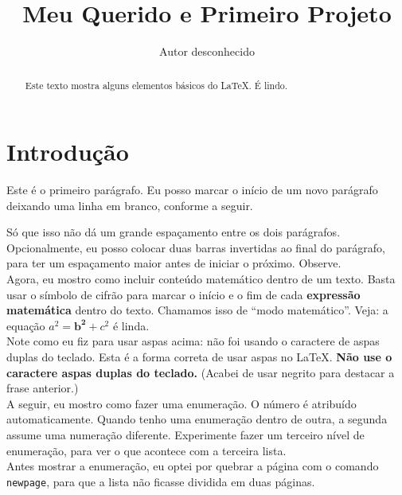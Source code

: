 \documentclass{article}
\title{Meu Querido e Primeiro Projeto}
\author{Autor desconhecido}
\begin{document}
\maketitle

\begin{abstract}
    Este texto mostra alguns elementos básicos do \LaTeX. É lindo.
\end{abstract}

\section{Introdução}

\indent Este é o primeiro parágrafo. Eu posso marcar o início de um novo parágrafo deixando uma linha em branco, conforme a seguir.

Só que isso não dá um grande espaçamento entre os dois parágrafos. Opcio\-nalmen\-te, eu posso colocar duas barras invertidas ao final do parágrafo, para ter um espaçamento maior antes de iniciar o próximo. Observe.\\

Agora, eu mostro como incluir conteúdo matemático dentro de um texto. Basta usar o símbolo de cifrão para marcar o início e o fim de cada \textbf{expressão matemática} dentro do texto. Chamamos isso de ``modo matemático''. Veja: a equação $a^2 = \mathbf{b^2} + c^2$ é linda.\\

Note como eu fiz para usar aspas acima: não foi usando o caractere de aspas duplas do teclado. Esta é a forma correta de usar aspas no \LaTeX. \textbf{Não use o caractere aspas duplas do teclado.} (Acabei de usar negrito para destacar a frase anterior.)\\

A seguir, eu mostro como fazer uma enumeração. O número é atribuído automaticamente. Quando tenho uma enumeração dentro de outra, a segunda assume uma numeração diferente. Experimente fazer um terceiro nível de enumeração, para ver o que acontece com a terceira lista.\\

Antes mostrar a enumeração, eu optei por quebrar a página com o comando \texttt{newpage}, para que a lista não ficasse dividida em duas páginas.\\

\newpage
\end{document}
